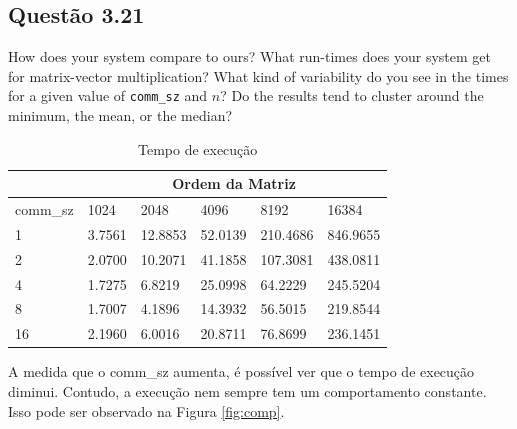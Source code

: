 

\subsection{Questão 3.21}

How does your system compare to ours? What run-times does your system get for matrix-vector multiplication? What kind of variability do you see in the times for a given value of \texttt{comm\_sz} and $n$? Do the results tend to cluster around the minimum, the mean, or the median?

\begin{table}[h!]
\centering
\begin{tabular}{|l|lllll|}
    \hline
     & \multicolumn{5}{c|}{Ordem da Matriz}\\
     \hline
    comm\_sz & 1024 & 2048 & 4096 & 8192 & 16384 \\
    \hline
    1 & 3.7561 & 12.8853 & 52.0139 & 210.4686 & 846.9655 \\
    2 & 2.0700 & 10.2071 & 41.1858 & 107.3081 & 438.0811 \\
    4 & 1.7275 & 6.8219 & 25.0998 & 64.2229 & 245.5204 \\
    8 & 1.7007 & 4.1896 & 14.3932 & 56.5015 & 219.8544 \\
    16 & 2.1960 & 6.0016 & 20.8711 & 76.8699 & 236.1451 \\
    \hline
\end{tabular}
\caption{Tempo de execução}
\label{tab:timeq21}
\end{table}

A medida que o comm\_sz aumenta, é possível ver que o tempo de execução diminui. Contudo, a execução nem sempre tem um comportamento constante. Isso pode ser observado na Figura \ref{fig:comp}.

